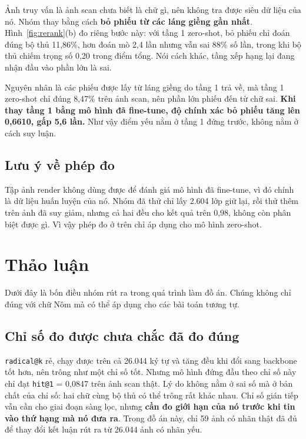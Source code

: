 \documentclass[conference,a4paper]{IEEEtran}
\newcommand{\code}[1]{{\small\texttt{#1}}}
\begin{document}
Ảnh truy vấn là ảnh scan chưa biết là chữ gì, nên không tra được siêu dữ liệu của nó. Nhóm thay bằng
cách \textbf{bỏ phiếu từ các láng giềng gần nhất}. Hình~\ref{fig:rerank}(b) đo riêng bước này: với
tầng 1 zero-shot, bỏ phiếu chỉ đoán đúng bộ thủ 11,86\%, hơn đoán mò 2,4 lần nhưng vẫn sai 88\% số
lần, trong khi bộ thủ chiếm trọng số 0,20 trong điểm tổng. Nói cách khác, tầng xếp hạng lại đang nhận
đầu vào phần lớn là sai.

Nguyên nhân là các phiếu được lấy từ láng giềng do tầng 1 trả về, mà tầng 1 zero-shot chỉ đúng 8,47\%
trên ảnh scan, nên phần lớn phiếu đến từ chữ sai. \textbf{Khi thay tầng 1 bằng mô hình đã fine-tune,
độ chính xác bỏ phiếu tăng lên 0,6610, gấp 5,6 lần.} Như vậy điểm yếu nằm ở tầng 1 đứng trước, không
nằm ở cách suy luận.

\subsection{Lưu ý về phép đo}

Tập ảnh render không dùng được để đánh giá mô hình đã fine-tune, vì đó chính là dữ liệu huấn luyện của
nó. Nhóm đã thử chỉ lấy 2.604 lớp giữ lại, rồi thử thêm trên ảnh đã suy giảm, nhưng cả hai đều cho kết
quả trên 0,98, không còn phân biệt được gì. Vì vậy phép đo ở trên chỉ áp dụng cho mô hình zero-shot.

\section{Thảo luận}
\label{sec:discuss}

Dưới đây là bốn điều nhóm rút ra trong quá trình làm đồ án. Chúng không chỉ đúng với chữ Nôm mà có thể
áp dụng cho các bài toán tương tự.

\subsection{Chỉ số đo được chưa chắc đã đo đúng}

\code{radical@k} rẻ, chạy được trên cả 26.044 ký tự và tăng đều khi đổi sang backbone tốt hơn, nên
trông như một chỉ số tốt. Nhưng mô hình đứng đầu theo chỉ số này chỉ đạt \code{hit@1} = 0,0847 trên
ảnh scan thật. Lý do không nằm ở sai số mà ở bản chất của chỉ số: hai chữ cùng bộ thủ có thể trông rất
khác nhau. Chỉ số gián tiếp vẫn cần cho giai đoạn sàng lọc, nhưng \textbf{cần đo giới hạn của nó
trước khi tin vào thứ hạng mà nó đưa ra}. Trong đồ án này, chỉ 59 ảnh có nhãn thật đã đủ để thay đổi
kết luận rút ra từ 26.044 ảnh có nhãn yếu.
\end{document}
